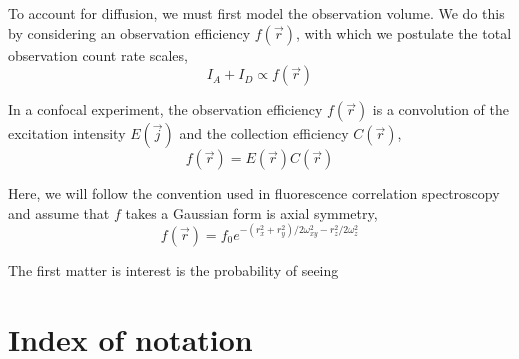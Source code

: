 \documentclass{article}
\begin{document}
To account for diffusion, we must first model the observation
volume. We do this by considering an observation efficiency $f(\vec
r)$, with which we postulate the total observation count rate scales,
\[ I_A + I_D \propto f(\vec r) \]

 In a confocal experiment, the observation efficiency
$f(\vec r)$ is a convolution of the excitation intensity $E(\vec j)$
and the collection efficiency $C(\vec r)$,
\[ f(\vec r) = E(\vec r) C(\vec r) \]

Here, we will follow the convention used in fluorescence correlation
spectroscopy\cite{Magde1972} and assume that $f$ takes a Gaussian
form is axial symmetry,
\[ f(\vec r) = f_0 e^{- (r_x^2 + r_y^2) / 2 \omega_{xy}^2 - r_z^2 / 2 \omega_z^2} \]

The first matter is interest is the probability of seeing 

\section{Index of notation}
\end{document}
